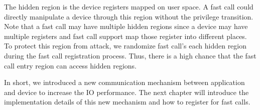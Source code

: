 The hidden region is the device registers mapped on user space. 
A fast call could directly manipulate a device through this region 
without the privilege transition. Note that a fast call may have 
multiple hidden regions since a device may have multiple registers 
and fast call support map those register into different places. 
To protect this region from attack, we randomize fast call's 
each hidden region during the fast call registration process. 
Thus, there is a high chance that the fast call entry region 
can access hidden regions.

In short, we introduced a new communication mechanism between 
application and device to increase the IO performance. 
The next chapter will introduce the implementation details 
of this new mechanism and how to register for fast calls.
\cleardoublepage

